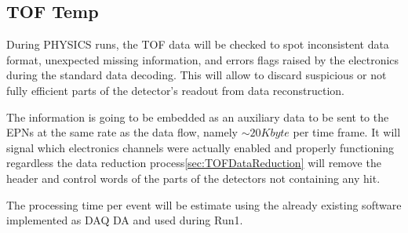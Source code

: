 \subsection{TOF Temp}
\label{sec:TOFTemp}
During PHYSICS runs, the TOF data will be checked to spot inconsistent data format, unexpected missing information, 
and errors flags raised by the electronics during the standard data decoding. This will allow to discard suspicious or not 
fully efficient parts of the detector's readout from data reconstruction. 

The information is going to be embedded as an auxiliary data to be sent to the EPNs
at the same rate as the data flow, namely $\sim 20 Kbyte$ per time frame. It will signal which electronics channels were
actually enabled and properly functioning regardless the data reduction process\ref{sec:TOFDataReduction} will remove 
the header and control words of the parts of the detectors not containing any hit. 

The processing time per event will be estimate using the already existing software implemented as DAQ DA and used 
during Run1.

